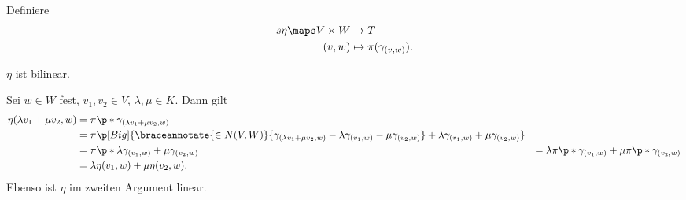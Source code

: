 Definiere
\begin{align*}s
  \eta\maps V\times W&\to T\\
  (v,w)&\mapsto \pi(\gamma_{(v,w)}).
\end{align*}
\begin{behauptung}
  \( \eta \) ist bilinear.
\end{behauptung}
Sei \( w\in W \) fest, \( v_1,v_2\in V \), \( \lambda,\mu\in K \). Dann gilt
\begin{align*}
  \eta(\lambda v_1+\mu v_2,w)&=\pi\p*{\gamma_{(\lambda v_1+\mu v_2 ,w)}}\\
  &=\pi\p[Big]{\braceannotate{\in N(V,W)}{\gamma_{(\lambda v_1+\mu v_2,w)}-\lambda \gamma_{(v_1,w)}-\mu\gamma_{(v_2,w)}}+\lambda \gamma_{(v_1,w)}+\mu\gamma_{(v_2,w)}}\\
  &=\pi\p*{\lambda \gamma_{(v_1,w)}+\mu\gamma_{(v_2,w)}}
  &=\lambda\pi\p*{\gamma_{(v_1,w)}}+\mu \pi\p*{\gamma_{(v_2,w)}}\\
  &=\lambda \eta(v_1,w)+\mu \eta(v_2,w).
\end{align*}
Ebenso ist \( \eta \) im zweiten Argument linear.
